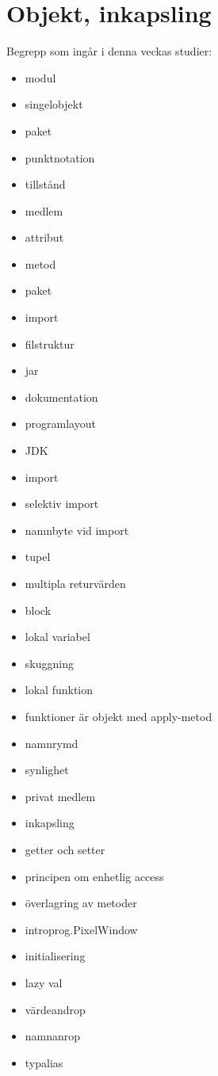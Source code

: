 \chapter{Objekt, inkapsling}\label{chapter:W04}
Begrepp som ingår i denna veckas studier:
\begin{multicols}{2}\begin{itemize}[noitemsep,label={$\square$},leftmargin=*]
\item modul
\item singelobjekt
\item paket
\item punktnotation
\item tillstånd
\item medlem
\item attribut
\item metod
\item paket
\item import
\item filstruktur
\item jar
\item dokumentation
\item programlayout
\item JDK
\item import
\item selektiv import
\item namnbyte vid import
\item tupel
\item multipla returvärden
\item block
\item lokal variabel
\item skuggning
\item lokal funktion
\item funktioner är objekt med apply-metod
\item namnrymd
\item synlighet
\item privat medlem
\item inkapsling
\item getter och setter
\item principen om enhetlig access
\item överlagring av metoder
\item introprog.PixelWindow
\item initialisering
\item lazy val
\item värdeandrop
\item namnanrop
\item typalias\end{itemize}\end{multicols}
